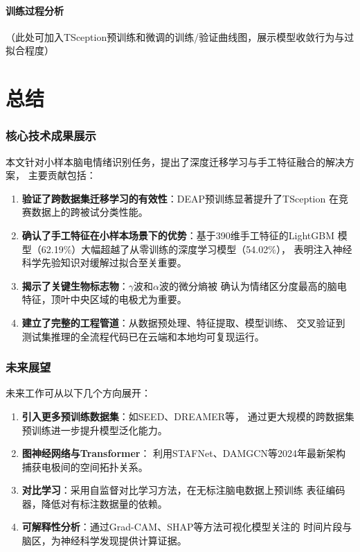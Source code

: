 \documentclass[12pt,a4paper]{ctexrep}
\begin{document}
\subsubsection{训练过程分析}

（此处可加入TSception预训练和微调的训练/验证曲线图，展示模型收敛行为与过拟合程度）

\chapter{总结}

\subsection{核心技术成果展示}

本文针对小样本脑电情绪识别任务，提出了深度迁移学习与手工特征融合的解决方案，
主要贡献包括：
\begin{enumerate}
    \item \textbf{验证了跨数据集迁移学习的有效性}：DEAP预训练显著提升了TSception
          在竞赛数据上的跨被试分类性能。
    \item \textbf{确认了手工特征在小样本场景下的优势}：基于390维手工特征的LightGBM
          模型（62.19\%）大幅超越了从零训练的深度学习模型（54.02\%），
          表明注入神经科学先验知识对缓解过拟合至关重要。
    \item \textbf{揭示了关键生物标志物}：$\gamma$波和$\alpha$波的微分熵被
          确认为情绪区分度最高的脑电特征，顶叶中央区域的电极尤为重要。
    \item \textbf{建立了完整的工程管道}：从数据预处理、特征提取、模型训练、
          交叉验证到测试集推理的全流程代码已在云端和本地均可复现运行。
\end{enumerate}

\subsection{未来展望}

未来工作可从以下几个方向展开：
\begin{enumerate}
    \item \textbf{引入更多预训练数据集}：如SEED、DREAMER等，
          通过更大规模的跨数据集预训练进一步提升模型泛化能力。
    \item \textbf{图神经网络与Transformer}：
          利用STAFNet、DAMGCN等2024年最新架构捕获电极间的空间拓扑关系。
    \item \textbf{对比学习}：采用自监督对比学习方法，在无标注脑电数据上预训练
          表征编码器，降低对有标注数据量的依赖。
    \item \textbf{可解释性分析}：通过Grad-CAM、SHAP等方法可视化模型关注的
          时间片段与脑区，为神经科学发现提供计算证据。
\end{enumerate}
\end{document}
